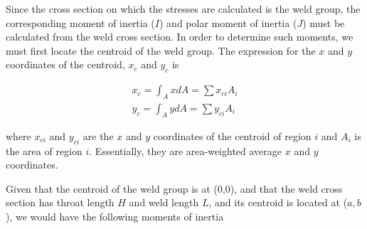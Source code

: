 \documentclass[
10pt,
a4paper,
openany,
svgnames,
]{book}
\begin{document}
Since the cross section on which the stresses are calculated is the weld group, the corresponding moment of inertia ($I$) and polar moment of inertia ($J$) must be calculated from the weld cross section. In order to determine such moments, we must first locate the centroid of the weld group. The expression for the $x$ and $y$ coordinates of the centroid, $x_c$ and $y_c$ is

\begin{align}
  \label{eqn: center of welds}
  x_c = \int_A xdA = \sum x_{ci}A_i \\
  y_c = \int_A ydA = \sum y_{ci}A_i
\end{align}

where  $x_{ci}$ and $y_{ci}$ are the $x$ and $y$ coordinates of the centroid of region $i$ and $A_i$ is the area of region $i$. Essentially, they are area-weighted average $x$ and $y$ coordinates.

Given that the centroid of the weld group is at (0,0), and that  the weld cross section has throat length $H$ and weld length $L$, and its centroid is located at ($a, b$), we would have the following moments of inertia

\begin{figure}[h]
  \centering
\end{figure}
\end{document}
